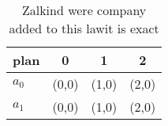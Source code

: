 \documentclass[a4paper]{article}
\begin{document}
\begin{table}
\begin{adjustbox}{width=0.5\columnwidth}
\begin{tabular}{|l|l|l|l|}
\hline
\textbf{plan} & \multicolumn{1}{c|}{\textbf{0}} & \multicolumn{1}{c|}{\textbf{1}} & \multicolumn{1}{c|}{\textbf{2}} \\ \hline
\textbf{$a_0$}  & (0,0) & (1,0) & (2,0) \\ \hline
\textbf{$a_1$}  & (0,0) & (1,0) & (2,0) \\ \hline
\end{tabular}
\end{adjustbox}
\caption{Zalkind were company added to this lawit is exact
}
\end{table}
\end{document}

